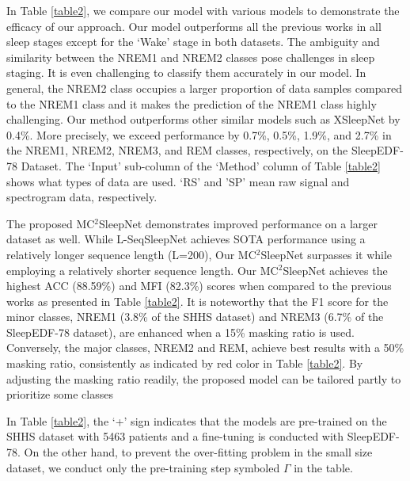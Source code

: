 In Table \ref{table2}, we compare our model with various models to demonstrate the efficacy of our approach. Our model outperforms all the previous works in all sleep stages except for the `Wake' stage in both datasets.  
% 
The ambiguity and similarity between the NREM1 and NREM2 classes pose challenges in sleep staging. It is even challenging to classify them accurately in our model.
%
In general, the NREM2 class occupies a larger proportion of data samples compared to the NREM1 class and it makes the prediction of the NREM1 class highly challenging.
%
Our method outperforms other similar models such as XSleepNet by 0.4\%. More precisely, we exceed performance by 0.7\%, 0.5\%, 1.9\%, and 2.7\% in the NREM1, NREM2, NREM3, and REM classes, respectively, on the SleepEDF-78 Dataset.
%
The `Input' sub-column of the `Method' column of Table \ref{table2} shows what types of data are used. `RS' and 'SP' mean raw signal and spectrogram data, respectively.




The proposed MC$^2$SleepNet demonstrates improved performance on a larger dataset as well. While L-SeqSleepNet \cite{phan2023seqsleepnet} achieves SOTA performance using a relatively longer sequence length (L=200), Our MC$^2$SleepNet surpasses it while employing a relatively shorter sequence length.
%
Our MC$^2$SleepNet achieves the highest ACC (88.59\%) and MFI (82.3\%) scores when compared to the previous works as presented in Table \ref{table2}.
%
It is noteworthy that the F1 score for the minor classes, NREM1 (3.8\% of the SHHS dataset) and NREM3 (6.7\% of the SleepEDF-78 dataset), are enhanced when a 15\% masking ratio is used. Conversely, the major classes, NREM2 and REM,  achieve best results with a 50\% masking ratio, consistently as indicated by red color in Table \ref{table2}.
% 
%
By adjusting the masking ratio readily, the proposed model can be tailored partly to prioritize some classes


In Table \ref{table2}, the `+' sign indicates that the models are pre-trained on the SHHS dataset with 5463 patients and a fine-tuning is conducted with SleepEDF-78. On the other hand, to prevent the over-fitting problem in the small size dataset, we conduct only the pre-training step symboled ${\Gamma}$ in the table.